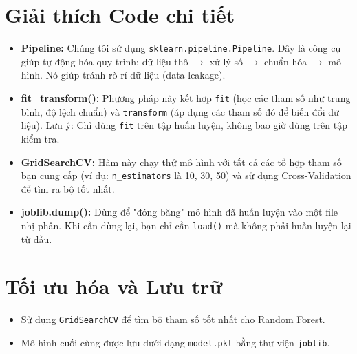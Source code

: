 \documentclass{article}
\begin{document}
\section{Giải thích Code chi tiết}
\begin{itemize}
    \item \textbf{Pipeline:} Chúng tôi sử dụng \texttt{sklearn.pipeline.Pipeline}. Đây là công cụ giúp tự động hóa quy trình: dữ liệu thô $\rightarrow$ xử lý số $\rightarrow$ chuẩn hóa $\rightarrow$ mô hình. Nó giúp tránh rò rỉ dữ liệu (data leakage).
    \item \textbf{fit\_transform():} Phương pháp này kết hợp \texttt{fit} (học các tham số như trung bình, độ lệch chuẩn) và \texttt{transform} (áp dụng các tham số đó để biến đổi dữ liệu). Lưu ý: Chỉ dùng \texttt{fit} trên tập huấn luyện, không bao giờ dùng trên tập kiểm tra.
    \item \textbf{GridSearchCV:} Hàm này chạy thử mô hình với tất cả các tổ hợp tham số bạn cung cấp (ví dụ: \texttt{n\_estimators} là 10, 30, 50) và sử dụng Cross-Validation để tìm ra bộ tốt nhất.
    \item \textbf{joblib.dump():} Dùng để "đóng băng" mô hình đã huấn luyện vào một file nhị phân. Khi cần dùng lại, bạn chỉ cần \texttt{load()} mà không phải huấn luyện lại từ đầu.
\end{itemize}

\section{Tối ưu hóa và Lưu trữ}
\begin{itemize}
    \item Sử dụng \texttt{GridSearchCV} để tìm bộ tham số tốt nhất cho Random Forest.
    \item Mô hình cuối cùng được lưu dưới dạng \texttt{model.pkl} bằng thư viện \texttt{joblib}.
\end{itemize}
\end{document}
